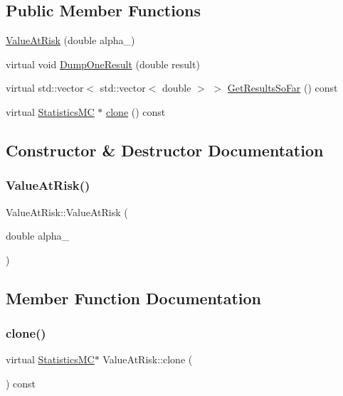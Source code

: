 \subsection*{Public Member Functions}
\begin{DoxyCompactItemize}
\item 
\hyperlink{classValueAtRisk_a0820143f2b5ef30c85655b350eddf3fa}{Value\+At\+Risk} (double alpha\+\_\+)
\item 
virtual void \hyperlink{classValueAtRisk_ad61f71fb24d6b6f4825e813137d4ef73}{Dump\+One\+Result} (double result)
\item 
virtual std\+::vector$<$ std\+::vector$<$ double $>$ $>$ \hyperlink{classValueAtRisk_a1ff78542a90e27d895382a9ea2169b6d}{Get\+Results\+So\+Far} () const
\item 
virtual \hyperlink{classStatisticsMC}{Statistics\+MC} $\ast$ \hyperlink{classValueAtRisk_a8fc9a8f4f9449a04ed177272c0931619}{clone} () const
\end{DoxyCompactItemize}


\subsection{Constructor \& Destructor Documentation}
\hypertarget{classValueAtRisk_a0820143f2b5ef30c85655b350eddf3fa}{}\label{classValueAtRisk_a0820143f2b5ef30c85655b350eddf3fa} 
\subsubsection{\texorpdfstring{Value\+At\+Risk()}{ValueAtRisk()}}
{\footnotesize\ttfamily Value\+At\+Risk\+::\+Value\+At\+Risk (\begin{DoxyParamCaption}\item[{double}]{alpha\+\_\+ }\end{DoxyParamCaption})}



\subsection{Member Function Documentation}
\hypertarget{classValueAtRisk_a8fc9a8f4f9449a04ed177272c0931619}{}\label{classValueAtRisk_a8fc9a8f4f9449a04ed177272c0931619} 
\subsubsection{\texorpdfstring{clone()}{clone()}}
{\footnotesize\ttfamily virtual \hyperlink{classStatisticsMC}{Statistics\+MC}$\ast$ Value\+At\+Risk\+::clone (\begin{DoxyParamCaption}{ }\end{DoxyParamCaption}) const\hspace{0.3cm}{\ttfamily [virtual]}}



